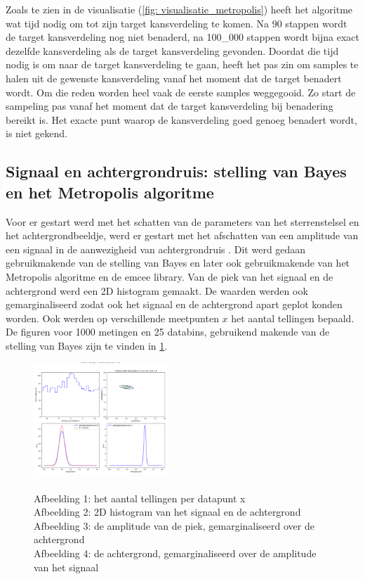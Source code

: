 Zoals te zien in de visualisatie (\cref{fig: visualisatie_metropolis}) heeft het algoritme wat tijd nodig om tot zijn target kansverdeling te komen. Na 90 stappen wordt de target kansverdeling nog niet benaderd, na 100\_000 stappen wordt bijna exact dezelfde kansverdeling als de target kansverdeling gevonden. Doordat die tijd nodig is om naar de target kansverdeling te gaan, heeft het pas zin om samples te halen uit de gewenste kansverdeling vanaf het moment dat de target benadert wordt. Om die reden worden heel vaak de eerste samples weggegooid. Zo start de sampeling pas vanaf het moment dat de target kansverdeling bij benadering bereikt is. Het exacte punt waarop de kansverdeling goed genoeg benadert wordt, is niet gekend.
\subsection{Signaal en achtergrondruis: stelling van Bayes en het Metropolis algoritme}
Voor er gestart werd met het schatten van de parameters van het sterrenstelsel en het achtergrondbeeldje, werd er gestart met het afschatten van een amplitude van een signaal in de aanwezigheid van achtergrondruis \cite{sivia-2006}. Dit werd gedaan gebruikmakende van de stelling van Bayes en later ook gebruikmakende van het Metropolis algoritme en de emcee library. Van de piek van het signaal en de achtergrond werd een 2D histogram gemaakt. De waarden werden ook gemarginaliseerd zodat ook het signaal en de achtergrond apart geplot konden worden. Ook werden op verschillende meetpunten $x$ het aantal tellingen bepaald. De figuren voor 1000 metingen en 25 databins, gebruikend makende van de stelling van Bayes zijn te vinden in \cref{fig:AB-bayes}. 
\begin{figure}
    \centering
    \includegraphics[width=0.45\textwidth]{Figures/figurenset1.png}
    \caption{\\Afbeelding 1: het aantal tellingen per datapunt x\\
    Afbeelding 2: 2D histogram van het signaal en de achtergrond \\
    Afbeelding 3: de amplitude van de piek, gemarginaliseerd over de achtergrond\\
    Afbeelding 4: de achtergrond, gemarginaliseerd over de amplitude van het signaal}
    \label{fig:AB-bayes}
\end{figure}\mbox{}
